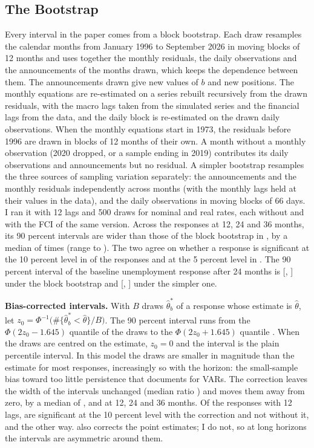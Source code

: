 \documentclass[11pt]{article}
\begin{document}
\begin{appendices}
\section{The Bootstrap}\label{app:boot}
Every interval in the paper comes from a block bootstrap. Each draw resamples the calendar months from January 1996 to September 2026 in moving blocks of 12 months and uses together the monthly residuals, the daily observations and the announcements of the months drawn, which keeps the dependence between them. The announcements drawn give new values of $b$ and new positions. The monthly equations are re-estimated on a series rebuilt recursively from the drawn residuals, with the macro lags taken from the simulated series and the financial lags from the data, and the daily block is re-estimated on the drawn daily observations. When the monthly equations start in 1973, the residuals before 1996 are drawn in blocks of 12 months of their own. A month without a monthly observation (2020 dropped, or a sample ending in 2019) contributes its daily observations and announcements but no residual. A simpler bootstrap resamples the three sources of sampling variation separately: the announcements and the monthly residuals independently across months (with the monthly lags held at their values in the data), and the daily observations in moving blocks of 66 days. I ran it with 12 lags and 500 draws for nominal and real rates, each without and with the FCI of the same version. Across the  responses at 12, 24 and 36 months, its 90 percent intervals are wider than those of the block bootstrap in , by a median of  times (range  to ). The two agree on whether a response is significant at the 10 percent level in  of the  responses and at the 5 percent level in . The 90 percent interval of the baseline unemployment response after 24 months is [, ] under the block bootstrap and [, ] under the simpler one.

\textbf{Bias-corrected intervals.} With $B$ draws $\hat\theta^*_b$ of a response whose estimate is $\hat\theta$, let $z_0=\Phi^{-1}\big(\#\{\hat\theta^*_b<\hat\theta\}/B\big)$. The 90 percent interval runs from the $\Phi(2z_0-1.645)$ quantile of the draws to the $\Phi(2z_0+1.645)$ quantile \citep{efron1987}. When the draws are centred on the estimate, $z_0=0$ and the interval is the plain percentile interval. In this model the draws are smaller in magnitude than the estimate for most responses, increasingly so with the horizon: the small-sample bias toward too little persistence that \citet{kilian1998} documents for VARs. The correction leaves the width of the intervals unchanged (median ratio ) and moves them away from zero, by a median of ,  and  at 12, 24 and 36 months. Of the  responses with 12 lags,  are significant at the 10 percent level with the correction and not without it, and  the other way. \citet{kilian1998} also corrects the point estimates; I do not, so at long horizons the intervals are asymmetric around them.


\end{appendices}
\end{document}
